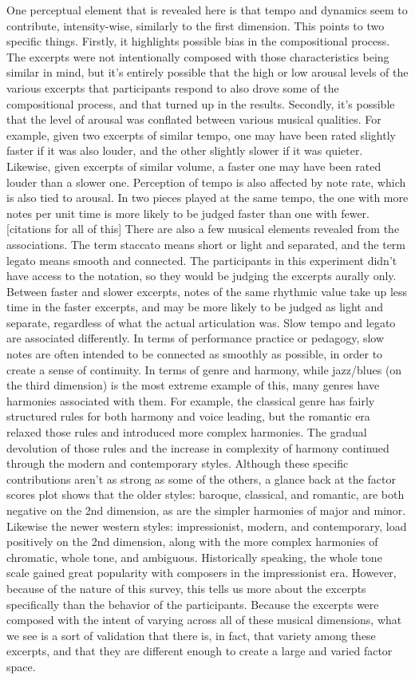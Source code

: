 \documentclass[
  english,
  man,floatsintext]{apa6}
\begin{document}
One perceptual element that is revealed here is that tempo and dynamics seem to contribute, intensity-wise, similarly to the first dimension. This points to two specific things. Firstly, it highlights possible bias in the compositional process. The excerpts were not intentionally composed with those characteristics being similar in mind, but it's entirely possible that the high or low arousal levels of the various excerpts that participants respond to also drove some of the compositional process, and that turned up in the results. Secondly, it's possible that the level of arousal was conflated between various musical qualities. For example, given two excerpts of similar tempo, one may have been rated slightly faster if it was also louder, and the other slightly slower if it was quieter. Likewise, given excerpts of similar volume, a faster one may have been rated louder than a slower one. Perception of tempo is also affected by note rate, which is also tied to arousal. In two pieces played at the same tempo, the one with more notes per unit time is more likely to be judged faster than one with fewer. {[}citations for all of this{]}
There are also a few musical elements revealed from the associations. The term staccato means short or light and separated, and the term legato means smooth and connected. The participants in this experiment didn't have access to the notation, so they would be judging the excerpts aurally only. Between faster and slower excerpts, notes of the same rhythmic value take up less time in the faster excerpts, and may be more likely to be judged as light and separate, regardless of what the actual articulation was. Slow tempo and legato are associated differently. In terms of performance practice or pedagogy, slow notes are often intended to be connected as smoothly as possible, in order to create a sense of continuity. In terms of genre and harmony, while jazz/blues (on the third dimension) is the most extreme example of this, many genres have harmonies associated with them. For example, the classical genre has fairly structured rules for both harmony and voice leading, but the romantic era relaxed those rules and introduced more complex harmonies. The gradual devolution of those rules and the increase in complexity of harmony continued through the modern and contemporary styles. Although these specific contributions aren't as strong as some of the others, a glance back at the factor scores plot shows that the older styles: baroque, classical, and romantic, are both negative on the 2nd dimension, as are the simpler harmonies of major and minor. Likewise the newer western styles: impressionist, modern, and contemporary, load positively on the 2nd dimension, along with the more complex harmonies of chromatic, whole tone, and ambiguous. Historically speaking, the whole tone scale gained great popularity with composers in the impressionist era.
However, because of the nature of this survey, this tells us more about the excerpts specifically than the behavior of the participants. Because the excerpts were composed with the intent of varying across all of these musical dimensions, what we see is a sort of validation that there is, in fact, that variety among these excerpts, and that they are different enough to create a large and varied factor space.
\end{document}
